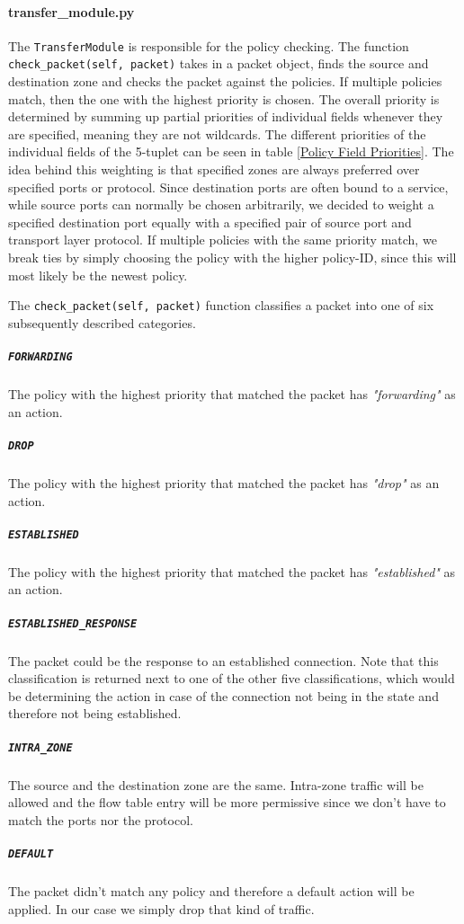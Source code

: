 \paragraph{transfer\_module.py} The \texttt{TransferModule} is responsible for the policy checking. The function \texttt{check\_packet(self, packet)} takes in a packet object, finds the source and destination zone and checks the packet against the policies. If multiple policies match, then the one with the highest priority is chosen. The overall priority is determined by summing up partial priorities of individual fields whenever they are specified, meaning they are not wildcards. The different priorities of the individual fields of the 5-tuplet can be seen in table \ref{Policy Field Priorities}. The idea behind this weighting is that specified zones are always preferred over specified ports or protocol. Since destination ports are often bound to a service, while source ports can normally be chosen arbitrarily, we decided to weight a specified destination port equally with a specified pair of source port and transport layer protocol. If multiple policies with the same priority match, we break ties by simply choosing the policy with the higher policy-ID, since this will most likely be the newest policy.

The \texttt{check\_packet(self, packet)} function classifies a packet into one of six subsequently described categories.
\subparagraph{\texttt{FORWARDING}} The policy with the highest priority that matched the packet has \textit{"forwarding"} as an action.
\subparagraph{\texttt{DROP}} The policy with the highest priority that matched the packet has \textit{"drop"} as an action.
\subparagraph{\texttt{ESTABLISHED}} The policy with the highest priority that matched the packet has \textit{"established"} as an action.    
\subparagraph{\texttt{ESTABLISHED\_RESPONSE}} The packet could be the response to an established connection. Note that this classification is returned next to one of the other five classifications, which would be determining the action in case of the connection not being in the state and therefore not being established.
\subparagraph{\texttt{INTRA\_ZONE}} The source and the destination zone are the same. Intra-zone traffic will be allowed and the flow table entry will be more permissive since we don't have to match the ports nor the protocol.
\subparagraph{\texttt{DEFAULT}} The packet didn't match any policy and therefore a default action will be applied. In our case we simply drop that kind of traffic.

